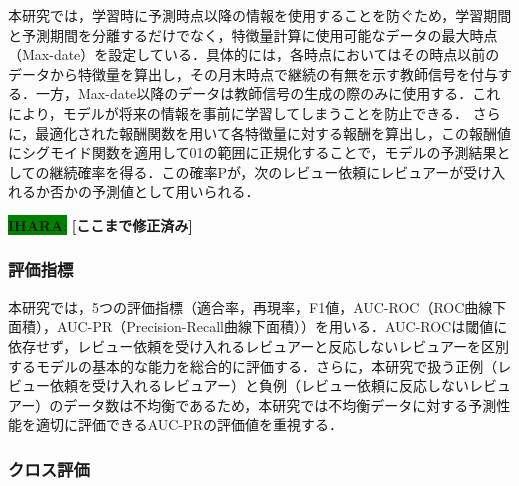 \documentclass[submit,techrep,noauthor]{ipsj}
\newcommand{\ihara}[1]{\colorbox{green}{{\bf IHARA}:}{\color{blue} {\textbf{[#1]}}}}
\begin{document}
本研究では，学習時に予測時点以降の情報を使用することを防ぐため，学習期間と予測期間を分離するだけでなく，特徴量計算に使用可能なデータの最大時点（Max-date）を設定している．具体的には，各時点においてはその時点以前のデータから特徴量を算出し，その月末時点で継続の有無を示す教師信号を付与する．一方，Max-date以降のデータは教師信号の生成の際のみに使用する．これにより，モデルが将来の情報を事前に学習してしまうことを防止できる．
さらに，最適化された報酬関数を用いて各特徴量に対する報酬を算出し，この報酬値にシグモイド関数を適用して01の範囲に正規化することで，モデルの予測結果としての継続確率を得る．この確率Pが，次のレビュー依頼にレビュアーが受け入れるか否かの予測値として用いられる．



\ihara{ここまで修正済み}

\subsubsection{評価指標}

本研究では，5つの評価指標（適合率，再現率，F1値，AUC-ROC（ROC曲線下面積），AUC-PR（Precision-Recall曲線下面積））を用いる．AUC-ROCは閾値に依存せず，レビュー依頼を受け入れるレビュアーと反応しないレビュアーを区別するモデルの基本的な能力を総合的に評価する．さらに，本研究で扱う正例（レビュー依頼を受け入れるレビュアー）と負例（レビュー依頼に反応しないレビュアー）のデータ数は不均衡であるため，本研究では不均衡データに対する予測性能を適切に評価できるAUC-PRの評価値を重視する．

\subsubsection{クロス評価}
\end{document}
